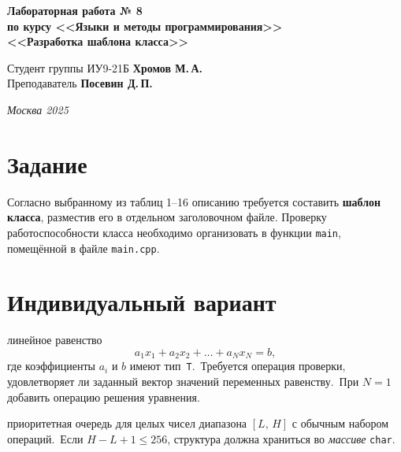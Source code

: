 \documentclass[a4paper, 14pt]{extarticle}
\begin{document}
\begin{titlepage}
\vspace{11em}
\begin{center}
  \Large\bfseries Лабораторная работа № 8\\[1ex]
  \large по курсу <<Языки и методы программирования>>\\[1ex]
  \large <<Разработка шаблона класса>>
\end{center}

\vspace{8em}
\begin{flushright}
  Студент группы ИУ9-21Б \textbf{Хромов М.\,А.}\\[2ex]
  Преподаватель \textbf{Посевин Д.\,П.}
\end{flushright}

\vfill
\begin{center}
  \textsl{Москва 2025}
\end{center}
\end{titlepage}

\section{Задание}\label{sect:task}
Согласно выбранному из таблиц 1–16 описанию требуется составить \textbf{шаблон класса}, разместив его в отдельном заголовочном файле. Проверку работоспособности класса необходимо организовать в функции \lstinline|main|, помещённой в файле \texttt{main.cpp}.

\section{Индивидуальный вариант}\label{sect:variant}
\begin{description}[leftmargin=0pt]
  \item[Equality\textless T, N\textgreater] линейное равенство 
        \[
          a_1x_1 + a_2x_2 + \dots + a_Nx_N = b,
        \]
        где коэффициенты $a_i$ и $b$ имеют тип~\lstinline|T|.\
        Требуется операция проверки, удовлетворяет ли заданный вектор значений переменных равенству.\
        При $N=1$ добавить операцию решения уравнения.
  \item[IntPQueue\textless L, H\textgreater] приоритетная очередь для целых чисел диапазона $[L,\,H]$ с обычным набором операций.\
        Если $H-L+1 \le 256$, структура должна храниться во \emph{массиве} \lstinline|char|.
\end{description}
\end{document}
